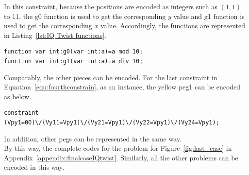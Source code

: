 \bigskip
\smallbreak
In this constraint, because the positions are encoded as integers such as $(1,1)$ to 11, the g0 function is used to get the corresponding $y$ value and g1 function is used to get the corresponding $x$ value. Accordingly, the functions are represented in Listing~\ref{lst:IQ Twist functions}.
\begin{lstlisting}[language=minizinc,numbers=none,caption={Encoding for functions},label={lst:IQ Twist functions}]
function var int:g0(var int:a)=a mod 10;
function var int:g1(var int:a)=a div 10;
\end{lstlisting}
\bigskip
\smallbreak
Comparably, the other pieces can be encoded. For the last constraint in Equation~\ref{equ:fourthconstrain}, as an instance, the yellow peg1 can be encoded as below.
\begin{lstlisting}[language=minizinc,numbers=none,caption={Encoding for constraint four},label={lst:IQ Twist constraint4}]
constraint (Vpy1=00)\/(Vy11=Vpy1)\/(Vy21=Vpy1)\/(Vy22=Vpy1)\/(Vy24=Vpy1);
\end{lstlisting}
\bigskip
\smallbreak
In addition, other pegs can be represented in the same way.
\\By this way, the complete codes for the problem for Figure~\ref{fig:last_case} in Appendix~\ref{appendix:finalcaseIQtwist}. Similarly, all the other problems can be encoded in this way.
